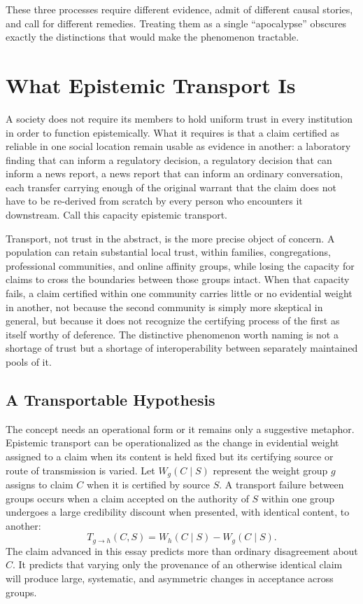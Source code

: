 \documentclass[11pt]{article}
\begin{document}
These three processes require different evidence, admit of different causal stories, and call for different remedies. Treating them as a single ``apocalypse'' obscures exactly the distinctions that would make the phenomenon tractable.

\section{What Epistemic Transport Is}

A society does not require its members to hold uniform trust in every institution in order to function epistemically. What it requires is that a claim certified as reliable in one social location remain usable as evidence in another: a laboratory finding that can inform a regulatory decision, a regulatory decision that can inform a news report, a news report that can inform an ordinary conversation, each transfer carrying enough of the original warrant that the claim does not have to be re-derived from scratch by every person who encounters it downstream. Call this capacity epistemic transport.

Transport, not trust in the abstract, is the more precise object of concern. A population can retain substantial local trust, within families, congregations, professional communities, and online affinity groups, while losing the capacity for claims to cross the boundaries between those groups intact. When that capacity fails, a claim certified within one community carries little or no evidential weight in another, not because the second community is simply more skeptical in general, but because it does not recognize the certifying process of the first as itself worthy of deference. The distinctive phenomenon worth naming is not a shortage of trust but a shortage of interoperability between separately maintained pools of it.

\subsection{A Transportable Hypothesis}

The concept needs an operational form or it remains only a suggestive metaphor. Epistemic transport can be operationalized as the change in evidential weight assigned to a claim when its content is held fixed but its certifying source or route of transmission is varied. Let $W_g(C \mid S)$ represent the weight group $g$ assigns to claim $C$ when it is certified by source $S$. A transport failure between groups occurs when a claim accepted on the authority of $S$ within one group undergoes a large credibility discount when presented, with identical content, to another:
\[
T_{g \rightarrow h}(C, S) = W_h(C \mid S) - W_g(C \mid S).
\]
The claim advanced in this essay predicts more than ordinary disagreement about $C$. It predicts that varying only the provenance of an otherwise identical claim will produce large, systematic, and asymmetric changes in acceptance across groups.
\end{document}
